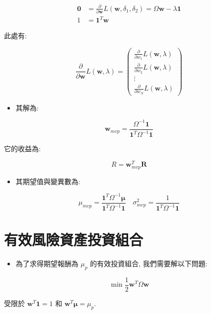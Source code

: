 \documentclass[letterpaper]{article}
\begin{document}
		\begin{align*}
			\mathbf{0} & =\frac{\partial}{\partial \mathbf{w}} L\left (\mathbf{w}, \delta_{1}, \delta_{2}\right) =\Omega \mathbf{w}-\lambda \mathbf{1}  \tag{1}\\
			1 & =\mathbf{1}^{T} \mathbf{w} \tag{2}
		\end{align*}
		
		
		此處有: 
		
		$$
		\frac{\partial}{\partial \mathbf{w}} L (\mathbf{w}, \lambda) =\left (\begin{array}{c}
			\frac{\partial}{\partial w_{1}} L (\mathbf{w}, \lambda) \\
			\frac{\partial}{\partial w_{2}} L (\mathbf{w}, \lambda) \\
			\vdots \\
			\frac{\partial}{\partial w_{N}} L (\mathbf{w}, \lambda) 
		\end{array}\right) 
		$$
		
		\begin{itemize}
			\item 其解為: 
		\end{itemize}
		
		$$
		\mathbf{w}_{m v p}=\frac{\Omega^{-1} \mathbf{1}}{\mathbf{1}^{T} \Omega^{-1} \mathbf{1}}
		$$
		
		它的收益為: 
		
		$$
		R=\mathbf{w}_{m v p}^{T} \mathbf{R}
		$$
		
		\begin{itemize}
			\item 其期望值與變異數為: 
		\end{itemize}
		
		$$
		\mu_{m v p}=\frac{\mathbf{1}^{T} \Omega^{-1} \boldsymbol{\mu}}{\mathbf{1}^{T} \Omega^{-1} \mathbf{1}} \quad \sigma_{m v p}^{2}=\frac{1}{\mathbf{1}^{T} \Omega^{-1} \mathbf{1}}
		$$
		
		\section{有效風險資產投資組合}
		\begin{itemize}
			\item 為了求得期望報酬為 $\mu_{p}$ 的有效投資組合, 我們需要解以下問題: 
		\end{itemize}
		
		
		$$
		\min \frac{1}{2} \mathbf{w}^{T} \Omega \mathbf{w}
		$$
		
		受限於 $\mathbf{w}^{T} \mathbf{1}=1$ 和 $\mathbf{w}^{T} \boldsymbol{\mu}=\mu_{p}$.
		
\end{document}
